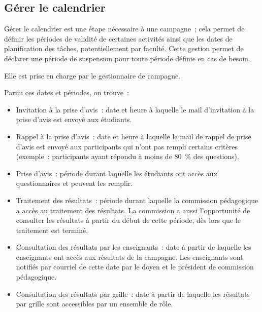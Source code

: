 \documentclass[a4paper,11pt]{report}
\begin{document}
\subsection{Gérer le calendrier}
Gérer le calendrier est une étape nécessaire à une campagne~; cela permet de définir les périodes de validité de certaines activités ainsi que les dates de planification des tâches, potentiellement par faculté.
Cette gestion permet de déclarer une période de suspension pour toute période définie en cas de besoin.

\noindent Elle est prise en charge par le gestionnaire de campagne.

\noindent Parmi ces dates et périodes, on trouve~:
\begin{itemize}
	\item Invitation à la prise d'avis~: date et heure à laquelle le mail d'invitation à la prise d'avis est envoyé aux étudiants.
	\item Rappel à la prise d'avis~: date et heure à laquelle le mail de rappel de prise d'avis est envoyé aux participants qui n'ont pas rempli certains critères (exemple~: participants ayant répondu à moins de 80~\% des questions).
	\item Prise d'avis~: période durant laquelle les étudiants ont accès aux questionnaires et peuvent les remplir.
	\item Traitement des résultats~: période durant laquelle la commission pédagogique a accès au traitement des résultats. La commission a aussi l'opportunité de consulter les résultats à partir du début de cette période, dès lors que le traitement est terminé.
	\item Consultation des résultats par les enseignants~: date à partir de laquelle les enseignants ont accès aux résultats de la campagne.
	Les enseignants sont notifiés par courriel de cette date par le doyen et le président de commission pédagogique.
	\item Consultation des résultats par grille~: date à partir de laquelle les résultats par grille sont accessibles par un ensemble de rôle.
\end{itemize}
~\newline{}
\end{document}
